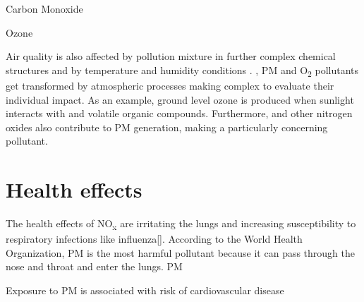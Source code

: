 Carbon Monoxide

Ozone 

Air quality is also affected by pollution mixture in further complex chemical structures and by temperature and humidity conditions . \NOTWO, PM and O\textsubscript{2}  pollutants get transformed by atmospheric processes making complex to evaluate their individual impact. As an example, ground level ozone is produced when sunlight interacts with \NOTWO and volatile organic compounds. Furthermore, \NOTWO and other nitrogen oxides also contribute to PM generation, making \NOX a particularly concerning pollutant.

\section{Health effects}

 The health effects of NO\textsubscript{x} are irritating the lungs and increasing susceptibility to respiratory infections like influenza[].
 According to the World Health Organization, PM is the most harmful pollutant because it can pass through the nose and throat and enter the lungs. PM 
 
Exposure to PM is associated with risk of cardiovascular disease \cite{Polichetti2009EffectsSystem}
